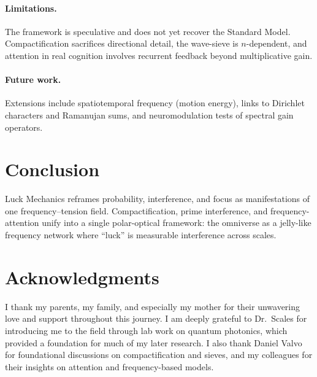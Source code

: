 \documentclass[12pt]{article}
\theoremstyle{plain}
\theoremstyle{definition}
\begin{document}
\paragraph{Limitations.} The framework is speculative and does not yet recover the Standard Model. Compactification sacrifices directional detail, the wave-sieve is $n$-dependent, and attention in real cognition involves recurrent feedback beyond multiplicative gain.

\paragraph{Future work.} Extensions include spatiotemporal frequency (motion energy), links to Dirichlet characters and Ramanujan sums, and neuromodulation tests of spectral gain operators.

\section{Conclusion}
Luck Mechanics reframes probability, interference, and focus as manifestations of one frequency–tension field. Compactification, prime interference, and frequency-attention unify into a single polar-optical framework: the omniverse as a jelly-like frequency network where ``luck'' is measurable interference across scales. 

\section*{Acknowledgments}
I thank my parents, my family, and especially my mother for their unwavering love and support throughout this journey.  
I am deeply grateful to Dr.~Scales for introducing me to the field through lab work on quantum photonics, which provided a foundation for much of my later research.  
I also thank Daniel Valvo for foundational discussions on compactification and sieves, and my colleagues for their insights on attention and frequency-based models.
\end{document}
